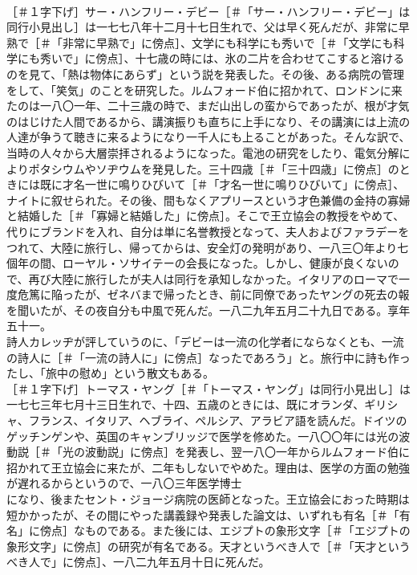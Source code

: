 \documentclass[8pt]{extreport}
\begin{document}
\begin{CJK}{UTF8}{min}
\\	［＃１字下げ］サー・ハンフリー・デビー［＃「サー・ハンフリー・デビー」は同行小見出し］は一七七八年十二月十七日生れで、父は早く死んだが、非常に早熟で［＃「非常に早熟で」に傍点］、文学にも科学にも秀いで［＃「文学にも科学にも秀いで」に傍点］、十七歳の時には、氷の二片を合わせてこすると溶けるのを見て、「熱は物体にあらず」という説を発表した。その後、ある病院の管理をして、「笑気」のことを研究した。ルムフォード伯に招かれて、ロンドンに来たのは一八〇一年、二十三歳の時で、まだ山出しの蛮からであったが、根が才気のはじけた人間であるから、講演振りも直ちに上手になり、その講演には上流の人達が争うて聴きに来るようになり一千人にも上ることがあった。そんな訳で、当時の人々から大層崇拝されるようになった。電池の研究をしたり、電気分解によりポタシウムやソヂウムを発見した。三十四歳［＃「三十四歳」に傍点］のときには既に才名一世に鳴りひびいて［＃「才名一世に鳴りひびいて」に傍点］、ナイトに叙せられた。その後、間もなくアプリースという才色兼備の金持の寡婦と結婚した［＃「寡婦と結婚した」に傍点］。そこで王立協会の教授をやめて、代りにブランドを入れ、自分は単に名誉教授となって、夫人およびファラデーをつれて、大陸に旅行し、帰ってからは、安全灯の発明があり、一八三〇年より七個年の間、ローヤル・ソサイテーの会長になった。しかし、健康が良くないので、再び大陸に旅行したが夫人は同行を承知しなかった。イタリアのローマで一度危篤に陥ったが、ゼネバまで帰ったとき、前に同僚であったヤングの死去の報を聞いたが、その夜自分も中風で死んだ。一八二九年五月二十九日である。享年五十一。
\\	詩人カレッヂが評していうのに、「デビーは一流の化学者にならなくとも、一流の詩人に［＃「一流の詩人に」に傍点］なったであろう」と。旅行中に詩も作ったし、「旅中の慰め」という散文もある。
\\	［＃１字下げ］トーマス・ヤング［＃「トーマス・ヤング」は同行小見出し］は一七七三年七月十三日生れで、十四、五歳のときには、既にオランダ、ギリシャ、フランス、イタリア、ヘブライ、ペルシア、アラビア語を読んだ。ドイツのゲッチンゲンや、英国のキャンブリッジで医学を修めた。一八〇〇年には光の波動説［＃「光の波動説」に傍点］を発表し、翌一八〇一年からルムフォード伯に招かれて王立協会に来たが、二年もしないでやめた。理由は、医学の方面の勉強が遅れるからというので、一八〇三年医学博士 
\\	になり、後またセント・ジョージ病院の医師となった。王立協会におった時期は短かかったが、その間にやった講義録や発表した論文は、いずれも有名［＃「有名」に傍点］なものである。また後には、エジプトの象形文字［＃「エジプトの象形文字」に傍点］の研究が有名である。天才というべき人で［＃「天才というべき人で」に傍点］、一八二九年五月十日に死んだ。

\end{CJK}
\end{document}
